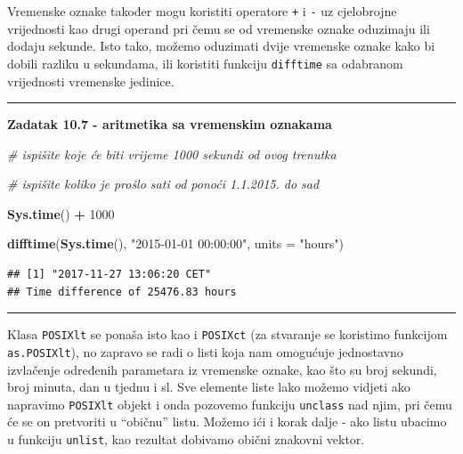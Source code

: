 \documentclass[]{book}
\newenvironment{Shaded}{\begin{snugshade}}{\end{snugshade}}
\newcommand{\KeywordTok}[1]{\textcolor[rgb]{0.13,0.29,0.53}{\textbf{#1}}}
\newcommand{\DataTypeTok}[1]{\textcolor[rgb]{0.13,0.29,0.53}{#1}}
\newcommand{\DecValTok}[1]{\textcolor[rgb]{0.00,0.00,0.81}{#1}}
\newcommand{\StringTok}[1]{\textcolor[rgb]{0.31,0.60,0.02}{#1}}
\newcommand{\CommentTok}[1]{\textcolor[rgb]{0.56,0.35,0.01}{\textit{#1}}}
\newcommand{\OperatorTok}[1]{\textcolor[rgb]{0.81,0.36,0.00}{\textbf{#1}}}
\newcommand{\NormalTok}[1]{#1}
\theoremstyle{definition}
\theoremstyle{definition}
\theoremstyle{definition}
\theoremstyle{remark}
\begin{document}
Vremenske oznake također mogu koristiti operatore \texttt{+} i
\texttt{-} uz cjelobrojne vrijednosti kao drugi operand pri čemu se od
vremenske oznake oduzimaju ili dodaju sekunde. Isto tako, možemo
oduzimati dvije vremenske oznake kako bi dobili razliku u sekundama, ili
koristiti funkciju \texttt{difftime} sa odabranom vrijednosti vremenske
jedinice.

\begin{center}\rule{0.5\linewidth}{\linethickness}\end{center}

\textbf{Zadatak 10.7 - aritmetika sa vremenskim oznakama}

\begin{Shaded}
\begin{Highlighting}[]
\CommentTok{# ispišite koje će biti vrijeme 1000 sekundi od ovog trenutka}

\CommentTok{# ispišite koliko je prošlo sati od ponoći 1.1.2015. do sad}
\end{Highlighting}
\end{Shaded}

\begin{Shaded}
\begin{Highlighting}[]
\KeywordTok{Sys.time}\NormalTok{() }\OperatorTok{+}\StringTok{ }\DecValTok{1000}

\KeywordTok{difftime}\NormalTok{(}\KeywordTok{Sys.time}\NormalTok{(), }\StringTok{"2015-01-01 00:00:00"}\NormalTok{, }\DataTypeTok{units =} \StringTok{"hours"}\NormalTok{)}
\end{Highlighting}
\end{Shaded}

\begin{verbatim}
## [1] "2017-11-27 13:06:20 CET"
## Time difference of 25476.83 hours
\end{verbatim}

\begin{center}\rule{0.5\linewidth}{\linethickness}\end{center}

Klasa \texttt{POSIXlt} se ponaša isto kao i \texttt{POSIXct} (za
stvaranje se koristimo funkcijom \texttt{as.POSIXlt}), no zapravo se
radi o listi koja nam omogućuje jednostavno izvlačenje određenih
parametara iz vremenske oznake, kao što su broj sekundi, broj minuta,
dan u tjednu i sl. Sve elemente liste lako možemo vidjeti ako napravimo
\texttt{POSIXlt} objekt i onda pozovemo funkciju \texttt{unclass} nad
njim, pri čemu će se on pretvoriti u ``običnu'' listu. Možemo ići i
korak dalje - ako listu ubacimo u funkciju \texttt{unlist}, kao rezultat
dobivamo obični znakovni vektor.
\end{document}
